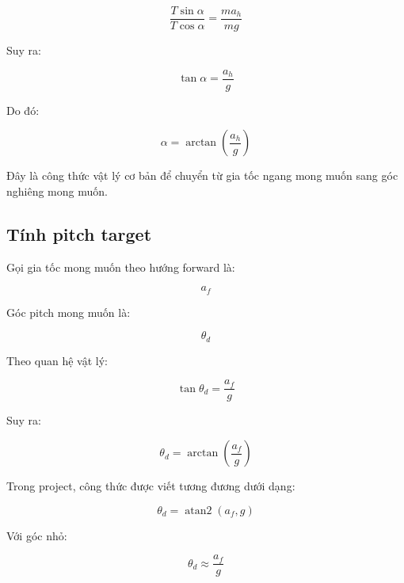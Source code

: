 \begin{equation}
    \frac{T\sin\alpha}{T\cos\alpha}
    =
    \frac{ma_h}{mg}
\end{equation}

Suy ra:

\begin{equation}
    \tan\alpha
    =
    \frac{a_h}{g}
\end{equation}

Do đó:

\begin{equation}
    \alpha
    =
    \arctan\left(\frac{a_h}{g}\right)
\end{equation}

Đây là công thức vật lý cơ bản để chuyển từ gia tốc ngang mong muốn sang
góc nghiêng mong muốn.

\subsection{Tính pitch target}

Gọi gia tốc mong muốn theo hướng forward là:

\begin{equation}
    a_f
\end{equation}

Góc pitch mong muốn là:

\begin{equation}
    \theta_d
\end{equation}

Theo quan hệ vật lý:

\begin{equation}
    \tan\theta_d
    =
    \frac{a_f}{g}
\end{equation}

Suy ra:

\begin{equation}
    \theta_d
    =
    \arctan\left(\frac{a_f}{g}\right)
\end{equation}

Trong project, công thức được viết tương đương dưới dạng:

\begin{equation}
    \theta_d
    =
    \operatorname{atan2}(a_f, g)
\end{equation}

Với góc nhỏ:

\begin{equation}
    \theta_d \approx \frac{a_f}{g}
\end{equation}

